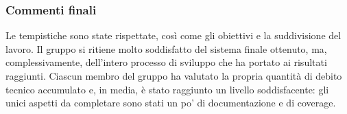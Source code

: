 \subsubsection*{Commenti finali}
Le tempistiche sono state rispettate, così come gli obiettivi e la suddivisione del lavoro. Il gruppo si ritiene molto
soddisfatto del sistema finale ottenuto, ma, complessivamente, dell'intero processo di sviluppo che ha portato ai
risultati raggiunti. Ciascun membro del gruppo ha valutato la propria quantità di debito tecnico accumulato e, in media,
è stato raggiunto un livello soddisfacente: gli unici aspetti da completare sono stati un po' di documentazione e di
coverage.

